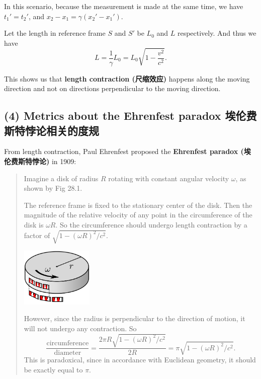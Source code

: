 In this scenario, because the measurement is made at the same time, we
have \(t_1' = t_2'\), and
\(x_2 - x_1 = \gamma \left( x_2' - x_1' \right)\).

Let the length in reference frame \(S\) and \(S'\) be \(L_0\) and \(L\)
respectively. And thus we have
\[L = \frac{1}{\gamma} L_0 = L_0 \sqrt{1 - \frac{v^2}{c^2}}.\]

This shows us that \textbf{length contraction (尺缩效应)} happens along
the moving direction and not on directions perpendicular to the moving
direction.

\subsection*{(4) Metrics about the Ehrenfest paradox
埃伦费斯特悖论相关的度规}\label{metrics-about-the-ehrenfest-paradox-ux57c3ux4f26ux8d39ux65afux7279ux6096ux8bbaux76f8ux5173ux7684ux5ea6ux89c4}

From length contraction, Paul Ehrenfest proposed the \textbf{Ehrenfest
paradox (埃伦费斯特悖论)} in 1909:

\begin{quote}
Imagine a disk of radius \(R\) rotating with constant angular velocity
\(\omega\), as shown by Fig 28.1.

The reference frame is fixed to the stationary center of the disk. Then
the magnitude of the relative velocity of any point in the circumference
of the disk is \(\omega R\). So the circumference should undergo length
contraction by a factor of \(\sqrt{1-(\omega R)^2/c^2}\).

\begin{center}
    \includegraphics[height=80pt]{assets/Ehrenfest-paradox-disk.png}
\end{center}

However, since the radius is perpendicular to the direction of motion,
it will not undergo any contraction. So
\[\frac{\mathrm{circumference}}{\mathrm{diameter}}=\frac{2\pi R \sqrt{1-(\omega R)^2/c^2}}{2R} = \pi \sqrt{1-(\omega R)^2/c^2}.\]
This is paradoxical, since in accordance with Euclidean geometry, it
should be exactly equal to \(\pi\).
\end{quote}

